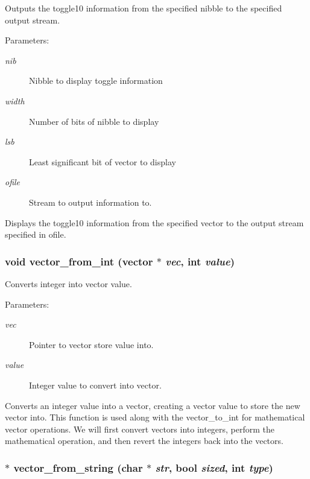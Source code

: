 Outputs the toggle10 information from the specified nibble to the specified output stream.

\begin{Desc}
\item[Parameters: ]\par
\begin{description}
\item[{\em 
nib}]Nibble to display toggle information \item[{\em 
width}]Number of bits of nibble to display \item[{\em 
lsb}]Least significant bit of vector to display \item[{\em 
ofile}]Stream to output information to.\end{description}
\end{Desc}
Displays the toggle10 information from the specified vector to the output stream specified in ofile. 
\subsubsection{\setlength{\rightskip}{0pt plus 5cm}void vector\_\-from\_\-int ({\bf vector} $\ast$ {\em vec}, int {\em value})}\label{vector_8c_a28}


Converts integer into vector value.

\begin{Desc}
\item[Parameters: ]\par
\begin{description}
\item[{\em 
vec}]Pointer to vector store value into. \item[{\em 
value}]Integer value to convert into vector.\end{description}
\end{Desc}
Converts an integer value into a vector, creating a vector value to store the new vector into. This function is used along with the vector\_\-to\_\-int for mathematical vector operations. We will first convert vectors into integers, perform the mathematical operation, and then revert the integers back into the vectors. 
\subsubsection{$\ast$ vector\_\-from\_\-string (char $\ast$ {\em str}, {\bf bool} {\em sized}, int {\em type})}\label{vector_8c_a31}


